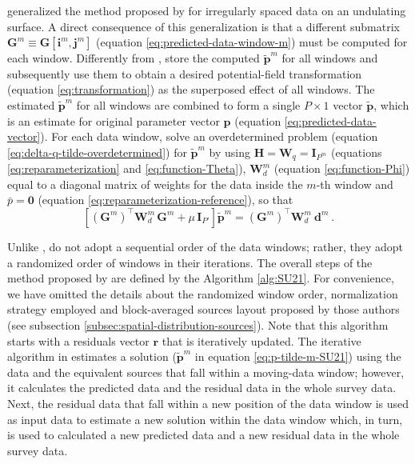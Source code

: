 \cite{soler-uieda2021} generalized the method proposed by \cite{leao-silva1989} for irregularly spaced data on an undulating surface.
A direct consequence of this generalization is that a different submatrix $\mathbf{G}^{m} \equiv \mathbf{G}[\mathbf{i}^{m}, \mathbf{j}^{m}]$ 
(equation \ref{eq:predicted-data-window-m}) must be computed for each window.
Differently from \cite{leao-silva1989}, \cite{soler-uieda2021} store the computed $\tilde{\mathbf{p}}^{m}$ for all windows and
subsequently use them to obtain a desired potential-field transformation (equation \ref{eq:transformation}) as the superposed
effect of all windows.
The estimated $\tilde{\mathbf{p}}^{m}$ for all windows are combined to form a single $P \times 1$ vector $\tilde{\mathbf{p}}$,
which is an estimate for original parameter vector $\mathbf{p}$ (equation \ref{eq:predicted-data-vector}).
For each data window, \cite{soler-uieda2021} solve an overdetermined problem (equation \ref{eq:delta-q-tilde-overdetermined}) 
for $\tilde{\mathbf{p}}^{m}$ by using 
$\mathbf{H} = \mathbf{W}_{q} = \mathbf{I}_{P^{m}}$ (equations \ref{eq:reparameterization} and \ref{eq:function-Theta}),
$\mathbf{W}^{m}_{d}$ (equation \ref{eq:function-Phi}) equal to a diagonal matrix of weights for the data inside the $m$-th window
and $\bar{p} = \mathbf{0}$ (equation \ref{eq:reparameterization-reference}), so that
\begin{equation}
	\left[ \left( \mathbf{G}^{m} \right)^{\top} \mathbf{W}^{m}_{d} \, \mathbf{G}^{m} + 
	\mu \, \mathbf{I}_{P'} \right] 
	\tilde{\mathbf{p}}^{m} = 
	\left( \mathbf{G}^{m} \right)^{\top} \mathbf{W}^{m}_{d} \: 
	\mathbf{d}^{m} \: .
	\label{eq:p-tilde-m-SU21}
\end{equation}

Unlike \cite{leao-silva1989}, \cite{soler-uieda2021} do not adopt a sequential order of the data windows; 
rather, they adopt a randomized order of windows in their  iterations.
The overall steps of the method proposed by \cite{soler-uieda2021} are defined by the Algorithm \ref{alg:SU21}.
For convenience, we have omitted the details about the randomized window order, normalization strategy 
employed and block-averaged sources layout proposed by those authors (see subsection \ref{subsec:spatial-distribution-sources}). 
Note that this algorithm starts with a residuals vector $\mathbf{r}$ that is iteratively updated.
The  iterative algorithm in \cite{soler-uieda2021} estimates a solution 
($\tilde{\mathbf{p}}^{m}$ in equation \ref{eq:p-tilde-m-SU21}) using the data and 
the equivalent sources that fall within a moving-data window; however, it calculates the predicted data and 
the residual data in the whole survey data. 
Next, the residual data  that fall within a new position of the data window is used as input data to estimate a new 
solution within the data window which, in turn, is used to calculated a new predicted data and a new residual data 
in the whole survey data.

